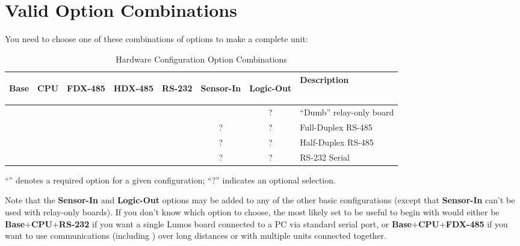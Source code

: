 \documentclass[letterpaper,twoside,onecolumn,openright,final]{memoir}
\begin{document}
\section{Valid Option Combinations}
You need to choose one of these combinations of options to make a complete unit:
\begin{table}[h]
\begin{center}
    \begin{tabular}{cccccccl}\toprule
	
\begin{sideways}\bfseries Base \end{sideways}
& \begin{sideways}\bfseries CPU \end{sideways}
& \begin{sideways}\bfseries FDX-485\end{sideways}
& \begin{sideways}\bfseries HDX-485\end{sideways}
& \begin{sideways}\bfseries RS-232 \end{sideways}
& \begin{sideways}\bfseries Sensor-In \end{sideways}
& \begin{sideways}\bfseries Logic-Out\quad\strut \end{sideways}
& \bfseries Description
\\\midrule
	\Checkmark&          &          &          &          &          & ?        & ``Dumb'' relay-only board\\\hline
	\Checkmark&\Checkmark&\Checkmark&          &          & ?        & ?        & Full-Duplex RS-485\\\hline
	\Checkmark&\Checkmark&          &\Checkmark&          & ?        & ?        & Half-Duplex RS-485\\\hline
	\Checkmark&\Checkmark&          &          &\Checkmark& ?        & ?        & RS-232 Serial\\\bottomrule
    \end{tabular}
\end{center}
\caption{Hardware Configuration Option Combinations}
\end{table}

``\Checkmark'' denotes a required option for a given configuration; ``?'' indicates an optional selection.

Note that the {\bfseries Sensor-In} and {\bfseries Logic-Out} options may be added to any of the other basic
configurations (except that {\bfseries Sensor-In} can't be used with relay-only boards).  If you don't know which option to choose, the most likely
set to be useful to begin with would either be {\bfseries Base}+{\bfseries CPU}+{\bfseries RS-232} if
you want a single Lumos board connected to a PC via standard serial port, or
{\bfseries Base}+{\bfseries CPU}+{\bfseries FDX-485} if you want to use  communications (including
) over long distances or with multiple units connected together.
\end{document}
